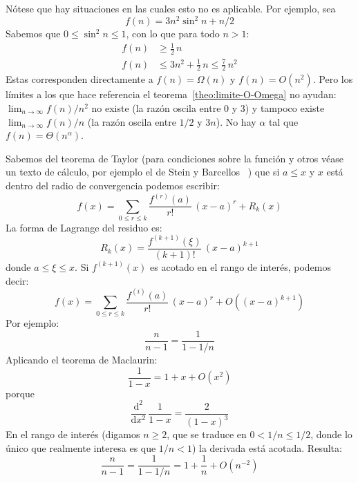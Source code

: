   Nótese que hay situaciones en las cuales esto no es aplicable.
  Por ejemplo,
  sea
  \begin{equation*}
    f(n)
      = 3 n^2 \sin^2 n + n / 2
  \end{equation*}
  Sabemos que \(0 \le \sin^2 n \le 1\),
  con lo que para todo \(n > 1\):
  \begin{align*}
    f(n)
      &\ge \frac{1}{2} \, n \\
    f(n)
      &\le 3 n^2 + \frac{1}{2} \, n
       \le \frac{7}{2} \, n^2
  \end{align*}
  Estas corresponden directamente a \(f(n) = \Omega(n)\)
  y \(f(n) = O(n^2)\).
  Pero los límites
  a los que hace referencia
  el teorema~\ref{theo:limite-O-Omega} no ayudan:
  \(\lim_{n \rightarrow \infty} f(n) / n^2\) no existe
  (la razón oscila entre 0 y 3)
  y tampoco existe \(\lim_{n \rightarrow \infty} f(n) / n\)
  (la razón oscila entre \(1 / 2\) y \(3 n\)).
  No hay \(\alpha\) tal que \(f(n) = \Theta(n^\alpha)\).

  Sabemos del teorema de Taylor%
  (para condiciones sobre la función
   y otros véase un texto de cálculo,
  por ejemplo el de Stein y Barcellos~%
   \cite{stein92:_calculus_anal_geom})
  que si \(a \le x\) y \(x\) está dentro del radio de convergencia
  podemos escribir:
  \begin{equation*}
    f(x)
      = \sum_{0 \le r \le k}
	  \frac{f^{(r)}(a)}{r!} \, (x - a)^r + R_k(x)
  \end{equation*}
  La forma de Lagrange del residuo es:
  \begin{equation*}
    R_k(x) = \frac{f^{(k + 1)}(\xi)}{(k + 1)!} \, (x - a)^{k + 1}
  \end{equation*}
  donde \(a \le \xi \le x\).
  Si \(f^{(k + 1)}(x)\) es acotado en el rango de interés,
  podemos decir:
  \begin{equation*}
    f(x)
      = \sum_{0 \le r \le k} \frac{f^{(i)}(a)}{r!} \, (x - a)^r
	  + O((x - a)^{k + 1})
  \end{equation*}
  Por ejemplo:
  \begin{equation*}
    \frac{n}{n - 1}
      = \frac{1}{1 - 1 / n}
  \end{equation*}
  Aplicando el teorema de Maclaurin:%
  \begin{equation*}
    \frac{1}{1 - x}
      = 1 + x + O(x^2)
  \end{equation*}
  porque
  \begin{equation*}
    \frac{\mathrm{d}^2}{\mathrm{d} x^2} \, \frac{1}{1 - x}
      = \frac{2}{(1 - x)^3}
  \end{equation*}
  En el rango de interés
  (digamos \(n \ge 2\),
   que se traduce en \(0 < 1 / n \le 1 / 2\),
   donde lo único que realmente interesa es que \(1 / n < 1\))
  la derivada está acotada.
  Resulta:
  \begin{equation*}
    \frac{n}{n - 1}
      = \frac{1}{1 - 1 / n}
      = 1 + \frac{1}{n} + O(n^{-2})
  \end{equation*}

